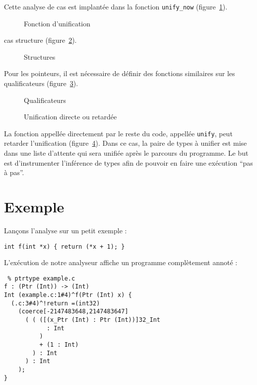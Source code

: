 Cette analyse de cas est implantée dans la fonction \texttt{unify_now}
(figure~\ref{fig:implem-unify-now}).

\begin{figure}
\caption{Fonction d'unification}
\label{fig:implem-unify-now}
\end{figure}

cas structure (figure~\ref{fig:implem-unify-structs}).

\begin{figure}
\caption{Structures}
\label{fig:implem-unify-structs}
\end{figure}

Pour les pointeurs, il est nécessaire de définir des fonctions similaires sur
les qualificateurs (figure~\ref{fig:implem-qualifs}).

\begin{figure}


  \caption{Qualificateurs}
\label{fig:implem-qualifs}

\end{figure}

\begin{figure}


\caption{Unification directe ou retardée}
\label{fig:implem-lazy}
\end{figure}

La fonction appellée directement par le reste du code, appellée \texttt{unify},
peut retarder l'unification (figure~\ref{fig:implem-lazy}). Dans ce cas, la
paire de types à unifier est mise dans une liste d'attente qui sera unifiée
après le parcours du programme. Le but est d'instrumenter l'inférence de types
afin de pouvoir en faire une exécution ``pas à pas''.

\section{Exemple}

Lançons l'analyse sur un petit exemple :

\begin{verbatim}
int f(int *x) { return (*x + 1); }
\end{verbatim}

L'exécution de notre analyseur affiche un programme complètement annoté :

\begin{verbatim}
 % ptrtype example.c
f : (Ptr (Int)) -> (Int)
Int (example.c:1#4)^f(Ptr (Int) x) {
  (.c:3#4)^!return =(int32)
    (coerce[-2147483648,2147483647]
      ( ( ([(x_Ptr (Int) : Ptr (Int))]32_Int
            : Int
          )
          + (1 : Int)
        ) : Int
      ) : Int
    );
}
\end{verbatim}

